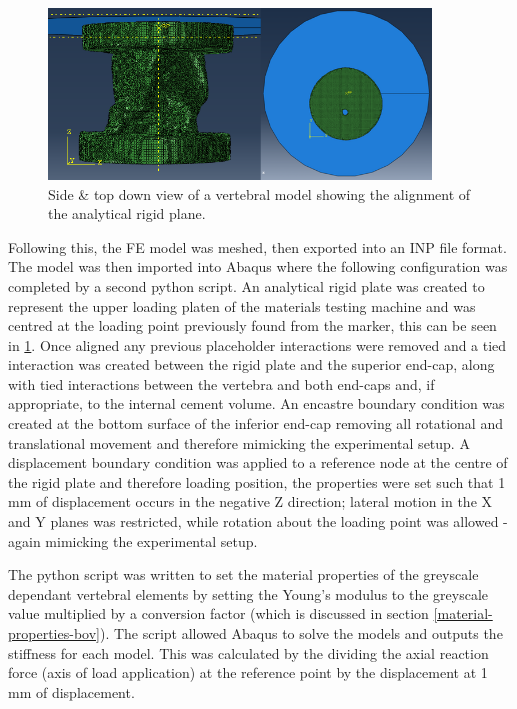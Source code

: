 \begin{figure}[ht!]
\centering

  \includegraphics[width=4in]{images/abaqus_side_view_Both.png}
  \caption{Side \& top down view of a vertebral model showing the alignment of the analytical rigid plane.}
\label{fig:abaqus_top_view}
\end{figure}


Following this, the FE model was meshed, then exported into an INP file format. The model was then imported into Abaqus where the following configuration was completed by a second python script. An analytical rigid plate was created to represent the upper loading platen of the materials testing machine and was centred at the loading point previously found from the marker, this can be seen in \cref{fig:abaqus_top_view}. Once aligned any previous placeholder interactions were removed and a tied interaction was created between the rigid plate and the superior end-cap, along with tied interactions between the vertebra and both end-caps and, if appropriate, to the internal cement volume. An encastre boundary condition was created at the bottom surface of the inferior end-cap removing all rotational and translational movement and therefore mimicking the experimental setup. A displacement boundary condition was applied to a reference node at the centre of the rigid plate and therefore loading position, the properties were set such that 1 mm of displacement occurs in the negative Z direction; lateral motion in the X and Y planes was restricted, while rotation about the loading point was allowed - again mimicking the experimental setup.

The python script was written to set the material properties of the greyscale dependant vertebral elements by setting the Young's modulus to the greyscale value multiplied by a conversion factor (which is discussed in section \ref{material-properties-bov}). The script allowed Abaqus to solve the models and outputs the stiffness for each model. This was calculated by the dividing the axial reaction force (axis of load application) at the reference point by the displacement at 1 mm of displacement.

